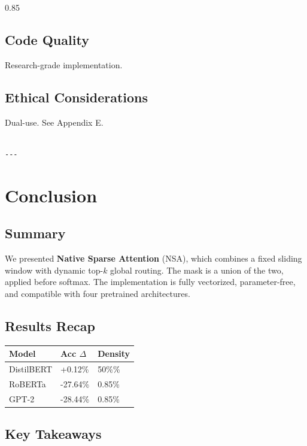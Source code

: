 0.85

\subsection{Code Quality}

Research-grade implementation.

\subsection{Ethical Considerations}

Dual-use. See Appendix E.
\begin{lstlisting}

---
\end{lstlisting}


\section{Conclusion}

\subsection{Summary}

We presented \textbf{Native Sparse Attention} (NSA), which combines a fixed 
sliding window with dynamic top-$k$ global routing. The mask is a union of 
the two, applied before softmax. The implementation is fully vectorized, 
parameter-free, and compatible with four pretrained architectures.

\subsection{Results Recap}

\begin{table}[H]
\centering
\small
\begin{tabular}{lll}
\toprule
\textbf{Model} & \textbf{Acc $\Delta$} & \textbf{Density} \\
\midrule
DistilBERT & +0.12\% & 50\%\% \\
RoBERTa & -27.64\% & 0.85\% \\
GPT-2 & -28.44\% & 0.85\% \\
\bottomrule
\end{tabular}
\end{table}

\subsection{Key Takeaways}

